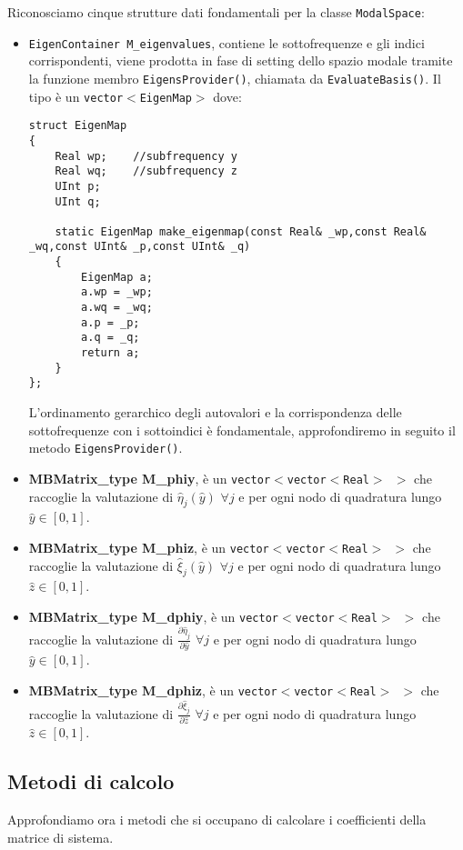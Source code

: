 Riconosciamo cinque strutture dati fondamentali per la classe \texttt{ModalSpace}:

\begin{itemize}

\item \texttt{EigenContainer M\_eigenvalues}, contiene le sottofrequenze e gli indici corrispondenti, viene prodotta in fase di setting dello spazio modale tramite la funzione membro \texttt{EigensProvider()}, chiamata da \texttt{EvaluateBasis()}. Il tipo \`e un \texttt{vector$<$EigenMap$>$} dove:
 
\begin{lstlisting}[style = general]
struct EigenMap
{
	Real wp;	//subfrequency y
	Real wq;	//subfrequency z
	UInt p;
	UInt q;
	
	static EigenMap make_eigenmap(const Real& _wp,const Real& _wq,const UInt& _p,const UInt& _q)
	{
		EigenMap a;
		a.wp = _wp;
		a.wq = _wq;
		a.p = _p;
		a.q = _q;
		return a;	
	}
};
\end{lstlisting}
L'ordinamento gerarchico degli autovalori e la corrispondenza delle sottofrequenze con i sottoindici \`e fondamentale, approfondiremo in seguito il metodo \texttt{EigensProvider()}.

\item \textbf{MBMatrix\_type M\_phiy}, \`e un \texttt{vector$<$vector$<$Real$>$ $>$} che raccoglie la valutazione di $\hat{\eta}_j(\hat{y})$ $\forall j$ e per ogni nodo di quadratura lungo $\hat{y}\in[0,1]$.

\item \textbf{MBMatrix\_type M\_phiz}, \`e un \texttt{vector$<$vector$<$Real$>$ $>$} che raccoglie la valutazione di $\hat{\xi}_j(\hat{y})$ $\forall j$ e per ogni nodo di quadratura lungo $\hat{z}\in[0,1]$.

\item \textbf{MBMatrix\_type M\_dphiy}, \`e un \texttt{vector$<$vector$<$Real$>$ $>$} che raccoglie la valutazione di $\frac{\partial\hat{\eta}_j}{\partial 	\hat{y}}$ $\forall j$ e per ogni nodo di quadratura lungo $\hat{y}\in[0,1]$.

\item \textbf{MBMatrix\_type M\_dphiz}, \`e un \texttt{vector$<$vector$<$Real$>$ $>$} che raccoglie la valutazione di $\frac{\partial\hat{\xi}_j}{\partial 	\hat{z}}$ $\forall j$ e per ogni nodo di quadratura lungo $\hat{z}\in[0,1]$.

\end{itemize}


\subsection{Metodi di calcolo}
Approfondiamo ora i metodi che si occupano di calcolare i coefficienti della matrice di sistema.

